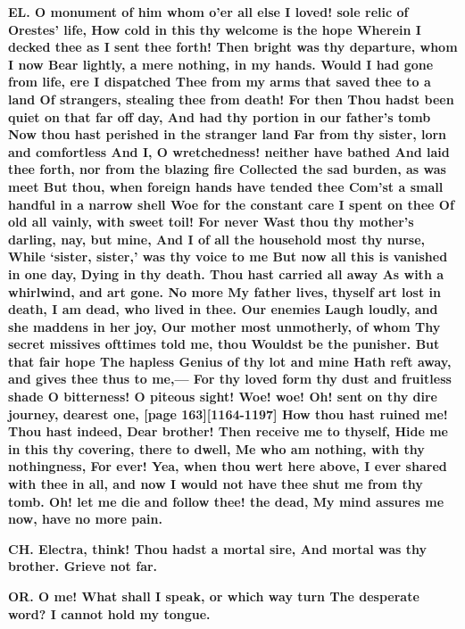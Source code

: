 \documentclass[11pt,letter]{book}
\begin{document}
\par \textbf{EL. O monument of him whom o’er all else I loved! sole relic of Orestes’ life, How cold in this thy welcome is the hope Wherein I decked thee as I sent thee forth! Then bright was thy departure, whom I now Bear lightly, a mere nothing, in my hands. Would I had gone from life, ere I dispatched Thee from my arms that saved thee to a land Of strangers, stealing thee from death! For then Thou hadst been quiet on that far off day, And had thy portion in our father’s tomb Now thou hast perished in the stranger land Far from thy sister, lorn and comfortless And I, O wretchedness! neither have bathed And laid thee forth, nor from the blazing fire Collected the sad burden, as was meet But thou, when foreign hands have tended thee Com’st a small handful in a narrow shell Woe for the constant care I spent on thee Of old all vainly, with sweet toil! For never Wast thou thy mother’s darling, nay, but mine, And I of all the household most thy nurse, While ‘sister, sister,’ was thy voice to me But now all this is vanished in one day, Dying in thy death. Thou hast carried all away As with a whirlwind, and art gone. No more My father lives, thyself art lost in death, I am dead, who lived in thee. Our enemies Laugh loudly, and she maddens in her joy, Our mother most unmotherly, of whom Thy secret missives ofttimes told me, thou Wouldst be the punisher. But that fair hope The hapless Genius of thy lot and mine Hath reft away, and gives thee thus to me,— For thy loved form thy dust and fruitless shade O bitterness! O piteous sight! Woe! woe! Oh! sent on thy dire journey, dearest one, [page 163][1164-1197] How thou hast ruined me! Thou hast indeed, Dear brother! Then receive me to thyself, Hide me in this thy covering, there to dwell, Me who am nothing, with thy nothingness, For ever! Yea, when thou wert here above, I ever shared with thee in all, and now I would not have thee shut me from thy tomb. Oh! let me die and follow thee! the dead, My mind assures me now, have no more pain.}
\par 

\par \textbf{CH. Electra, think! Thou hadst a mortal sire, And mortal was thy brother. Grieve not far.}
\par 

\par \textbf{OR. O me! What shall I speak, or which way turn The desperate word? I cannot hold my tongue.}
\par 
\end{document}
